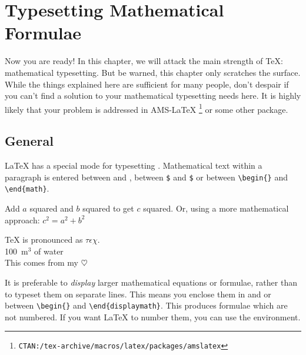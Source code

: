 ﻿%
 
\chapter{Typesetting Mathematical Formulae}

\begin{intro}
  Now you are ready! In this chapter, we will attack the main strength
  of \TeX{}: mathematical typesetting. But be warned, this chapter
  only scratches the surface. While the things explained here are
  sufficient for many people, don't despair if you can't find a
  solution to your mathematical typesetting needs here. It is highly likely
  that your problem is addressed in AMS-\LaTeX{}%
  \footnote{\texttt{CTAN:/tex-archive/macros/latex/packages/amslatex}}
  or some other package.
\end{intro}
  
\section{General}

\LaTeX{} has a special mode for typesetting .
Mathematical text within a paragraph is entered between \ci{(}
and \ci{)},  %
between \texttt{\$} and \texttt{\$} or between
\verb|\begin{|\verb|}| and \verb|\end{math}|.

\begin{example}
Add $a$ squared and $b$ squared 
to get $c$ squared. Or, using 
a more mathematical approach:
$c^{2}=a^{2}+b^{2}$
\end{example}

\begin{example}
\TeX{} is pronounced as 
$\tau\epsilon\chi$.\\[6pt]
100~m$^{3}$ of water\\[6pt]
This comes from my $\heartsuit$
\end{example}

It is preferable to \emph{display} larger mathematical equations or formulae,
rather than to typeset them on separate lines. This means you enclose them
in \ci{[} and \ci{]} or between
\verb|\begin{|\verb|}| and
  \verb|\end{displaymath}|.  This produces formulae which are not
numbered. If you want \LaTeX{} to number them, you can use the
 environment.


